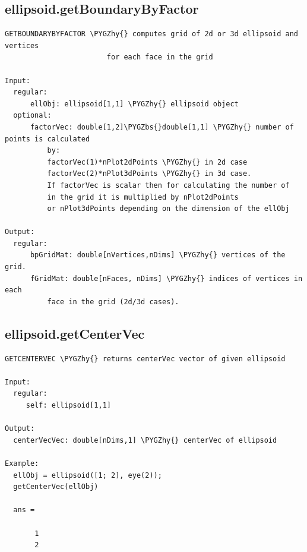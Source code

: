 \documentclass[letterpaper,10pt,english]{sphinxmanual}
\def\PYGZbs{\char`\\}
\def\PYGZhy{\char`\-}
\begin{document}
\subsection{ellipsoid.getBoundaryByFactor}
\label{chap_functions:ellipsoid-getboundarybyfactor}
\begin{Verbatim}[commandchars=\\\{\}]
  GETBOUNDARYBYFACTOR \PYGZhy{} computes grid of 2d or 3d ellipsoid and vertices
                        for each face in the grid

Input:
  regular:
      ellObj: ellipsoid[1,1] \PYGZhy{} ellipsoid object
  optional:
      factorVec: double[1,2]\PYGZbs{}double[1,1] \PYGZhy{} number of points is calculated
          by:
          factorVec(1)*nPlot2dPoints \PYGZhy{} in 2d case
          factorVec(2)*nPlot3dPoints \PYGZhy{} in 3d case.
          If factorVec is scalar then for calculating the number of
          in the grid it is multiplied by nPlot2dPoints
          or nPlot3dPoints depending on the dimension of the ellObj

Output:
  regular:
      bpGridMat: double[nVertices,nDims] \PYGZhy{} vertices of the grid.
      fGridMat: double[nFaces, nDims] \PYGZhy{} indices of vertices in each
          face in the grid (2d/3d cases).
\end{Verbatim}


\subsection{ellipsoid.getCenterVec}
\label{chap_functions:ellipsoid-getcentervec}
\begin{Verbatim}[commandchars=\\\{\}]
GETCENTERVEC \PYGZhy{} returns centerVec vector of given ellipsoid

Input:
  regular:
     self: ellipsoid[1,1]

Output:
  centerVecVec: double[nDims,1] \PYGZhy{} centerVec of ellipsoid

Example:
  ellObj = ellipsoid([1; 2], eye(2));
  getCenterVec(ellObj)

  ans =

       1
       2
\end{Verbatim}
\end{document}
